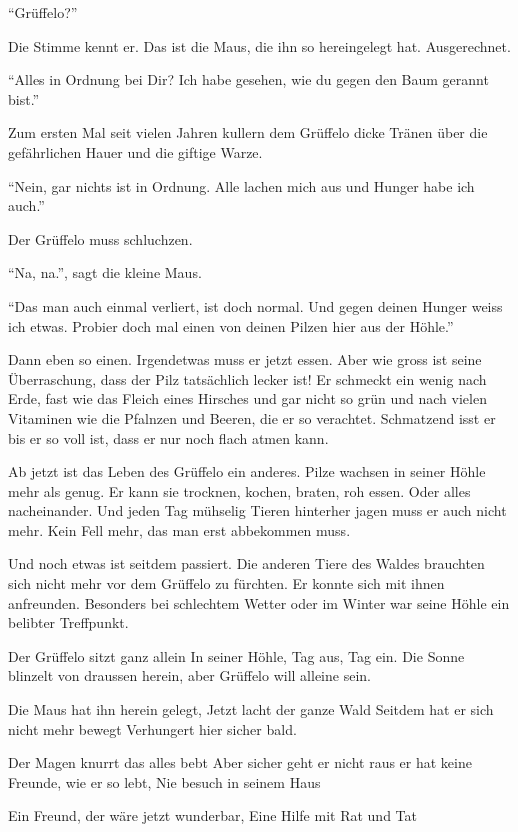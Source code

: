 \enquote{Grüffelo?}

Die Stimme kennt er. Das ist die Maus, die ihn so hereingelegt hat. Ausgerechnet.

\enquote{Alles in Ordnung bei Dir? Ich habe gesehen, wie du gegen den Baum gerannt bist.}

Zum ersten Mal seit vielen Jahren kullern dem Grüffelo dicke Tränen über die gefährlichen Hauer und die giftige Warze. 

\enquote{Nein, gar nichts ist in Ordnung. Alle lachen mich aus und Hunger habe ich auch.}

Der Grüffelo muss schluchzen.

\enquote{Na, na.}, sagt die kleine Maus.

\enquote{Das man auch einmal verliert, ist doch normal. Und gegen deinen Hunger weiss ich etwas. Probier doch mal einen von deinen Pilzen hier aus der Höhle.}



Dann eben so einen. Irgendetwas muss er jetzt essen. Aber wie gross ist seine Überraschung, dass der Pilz tatsächlich lecker ist! Er schmeckt ein wenig nach Erde, fast wie das Fleich eines Hirsches und gar nicht so grün und nach vielen Vitaminen wie die Pfalnzen und Beeren, die er so verachtet. Schmatzend isst er bis er so voll ist, dass er nur noch flach atmen kann.

Ab jetzt ist das Leben des Grüffelo ein anderes. Pilze wachsen in seiner Höhle mehr als genug. Er kann sie trocknen, kochen, braten, roh essen. Oder alles nacheinander. Und jeden Tag mühselig Tieren hinterher jagen muss er auch nicht mehr. Kein Fell mehr, das man erst abbekommen muss. 

Und noch etwas ist seitdem passiert. Die anderen Tiere des Waldes brauchten sich nicht mehr vor dem Grüffelo zu fürchten. Er konnte sich mit ihnen anfreunden. Besonders bei schlechtem Wetter oder im Winter war seine Höhle ein belibter Treffpunkt. 



\vfill



Der Grüffelo sitzt ganz allein
In seiner Höhle, Tag aus, Tag ein.
Die Sonne blinzelt von draussen herein,
aber Grüffelo will alleine sein.

Die Maus hat ihn herein gelegt,
Jetzt lacht der ganze Wald
Seitdem hat er sich nicht mehr bewegt
Verhungert hier sicher bald.

Der Magen knurrt das alles bebt
Aber sicher geht er nicht raus
er hat keine Freunde, wie er so lebt,
Nie besuch in seinem Haus

Ein Freund, der wäre jetzt wunderbar,
Eine Hilfe mit Rat und Tat

